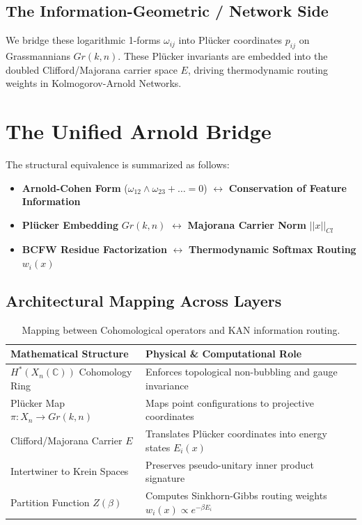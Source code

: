 \documentclass[11pt,a4paper]{article}
\begin{document}
\subsection{The Information-Geometric / Network Side}
We bridge these logarithmic 1-forms $\omega_{ij}$ into Plücker coordinates $p_{ij}$ on Grassmannians $Gr(k, n)$. These Plücker invariants are embedded into the doubled Clifford/Majorana carrier space $E$, driving thermodynamic routing weights in Kolmogorov-Arnold Networks.

\section{The Unified Arnold Bridge}

The structural equivalence is summarized as follows:

\begin{itemize}
    \item \textbf{Arnold-Cohen Form} ($\omega_{12}\wedge\omega_{23} + \dots = 0$) $\longleftrightarrow$ \textbf{Conservation of Feature Information}
    \item \textbf{Plücker Embedding} $Gr(k, n)$ $\longleftrightarrow$ \textbf{Majorana Carrier Norm} $||x||_{Cl}$
    \item \textbf{BCFW Residue Factorization} $\longleftrightarrow$ \textbf{Thermodynamic Softmax Routing} $w_i(x)$
\end{itemize}

\subsection{Architectural Mapping Across Layers}

\begin{table}[h]
\centering
\begin{tabular}{@{}lll@{}}
\toprule
\textbf{Mathematical Structure} & \textbf{Physical \& Computational Role} \\ \midrule
$H^*(X_n(\mathbb{C}))$ Cohomology Ring & Enforces topological non-bubbling and gauge invariance \\
Plücker Map $\pi: X_n \to Gr(k, n)$ & Maps point configurations to projective coordinates \\
Clifford/Majorana Carrier $E$ & Translates Plücker coordinates into energy states $E_i(x)$ \\
Intertwiner to Krein Spaces & Preserves pseudo-unitary inner product signature \\
Partition Function $Z(\beta)$ & Computes Sinkhorn-Gibbs routing weights $w_i(x) \propto e^{-\beta E_i}$ \\
\bottomrule
\end{tabular}
\caption{Mapping between Cohomological operators and KAN information routing.}
\end{table}
\end{document}
